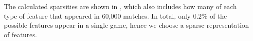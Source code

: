 The calculated sparsities are shown in , which also includes how many of each type of feature that appeared in 60,000 matches.
In total, only $0.2\%$ of the possible features appear in a single game, hence we choose a sparse representation of features. 


